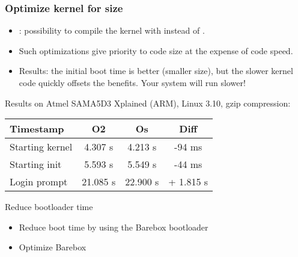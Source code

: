 \begin{frame}
\frametitle{Optimize kernel for size}
\begin{itemize}
\item {}: possibility to compile the kernel
      with  instead of .
\item Such optimizations give priority to code size at
      the expense of code speed.
\item Results: the initial boot time is better (smaller
      size), but the slower kernel code quickly offsets
      the benefits. Your system will run slower!  
\end{itemize}
Results on Atmel SAMA5D3 Xplained (ARM), Linux 3.10, gzip compression:
\newline\newline
\begin{tabular}{| l || c | c | c |}
\hline
Timestamp & O2 & Os & Diff \\
\hline
Starting kernel & 4.307 s & 4.213 s & -94 ms \\
Starting init & 5.593 s & 5.549 s & -44 ms \\
Login prompt & 21.085 s & 22.900 s & + 1.815 s \\
\hline
\end{tabular}
\newline\newline
\small
\end{frame}

\setuplabframe
{Reduce bootloader time}
{
\begin{itemize}
\item Reduce boot time by using the Barebox bootloader
\item Optimize Barebox
\end{itemize}
}

